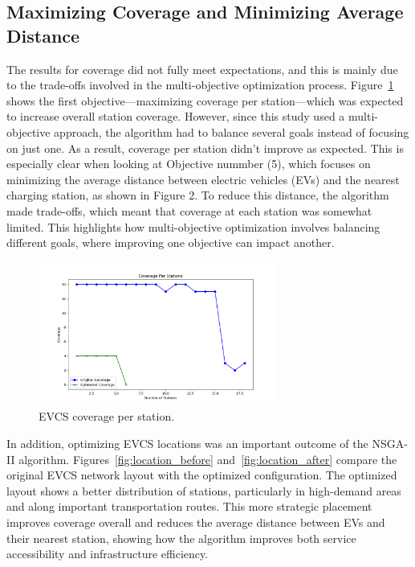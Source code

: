 \subsection{Maximizing Coverage and Minimizing Average Distance}

The results for coverage did not fully meet expectations, and this is mainly due to the trade-offs involved in the multi-objective optimization process. Figure~\ref{fig:EVCS coverage} shows the first objective—maximizing coverage per station—which was expected to increase overall station coverage. However, since this study used a multi-objective approach, the algorithm had to balance several goals instead of focusing on just one. As a result, coverage per station didn’t improve as expected. This is especially clear when looking at Objective nummber (5), which focuses on minimizing the average distance between electric vehicles (EVs) and the nearest charging station, as shown in Figure 2. To reduce this distance, the algorithm made trade-offs, which meant that coverage at each station was somewhat limited. This highlights how multi-objective optimization involves balancing different goals, where improving one objective can impact another.

\begin{figure}[h!]
\centering
\includegraphics[width=0.7\textwidth]{../Figures/coverage_stations.png}
\caption{EVCS coverage per station.}
\label{fig:EVCS coverage}
\end{figure}

In addition, optimizing EVCS locations was an important outcome of the NSGA-II algorithm. Figures~\ref{fig:location_before} and~\ref{fig:location_after} compare the original EVCS network layout with the optimized configuration. The optimized layout shows a better distribution of stations, particularly in high-demand areas and along important transportation routes. This more strategic placement improves coverage overall and reduces the average distance between EVs and their nearest station, showing how the algorithm improves both service accessibility and infrastructure efficiency.

